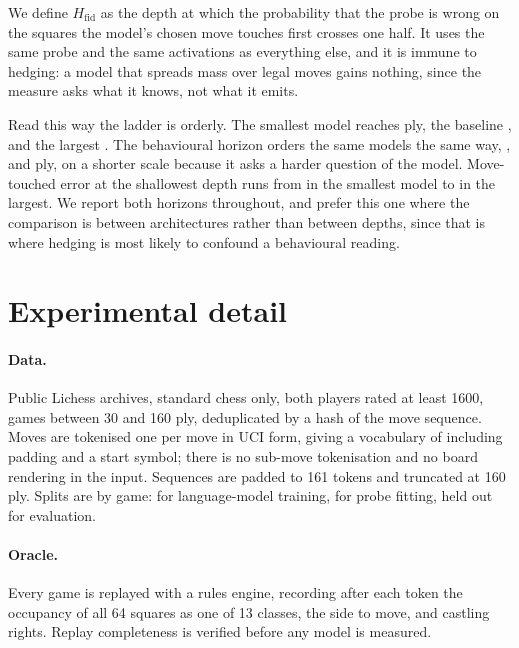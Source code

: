 We define $H_{\mathrm{fid}}$ as the depth at which the probability that the probe
is wrong on the squares the model's chosen move touches first crosses one half.
It uses the same probe and the same activations as everything else, and it is
immune to hedging: a model that spreads mass over legal moves gains nothing,
since the measure asks what it knows, not what it emits.

Read this way the ladder is orderly. The smallest model reaches
 ply, the baseline , and the largest
. The behavioural horizon orders the same models the same way,
,  and  ply, on a shorter
scale because it asks a harder question of the model. Move-touched error at
the shallowest depth runs from  in the smallest model to
 in the largest. We report both horizons throughout, and
prefer this one where the comparison is between architectures rather than between
depths, since that is where hedging is most likely to confound a behavioural
reading.


\section{Experimental detail}
\label{app:methods}

\paragraph{Data.} Public Lichess archives, standard chess only, both players rated
at least 1600, games between 30 and 160 ply, deduplicated by a hash of the move
sequence. Moves are tokenised one per move in UCI form, giving a vocabulary of
 including padding and a start symbol; there is no sub-move
tokenisation and no board rendering in the input. Sequences are padded to 161
tokens and truncated at 160 ply. Splits are by game:  for
language-model training,  for probe fitting,
 held out for evaluation.

\paragraph{Oracle.} Every game is replayed with a rules engine, recording after
each token the occupancy of all 64 squares as one of 13 classes, the side to
move, and castling rights. Replay completeness is verified before any model is
measured.

